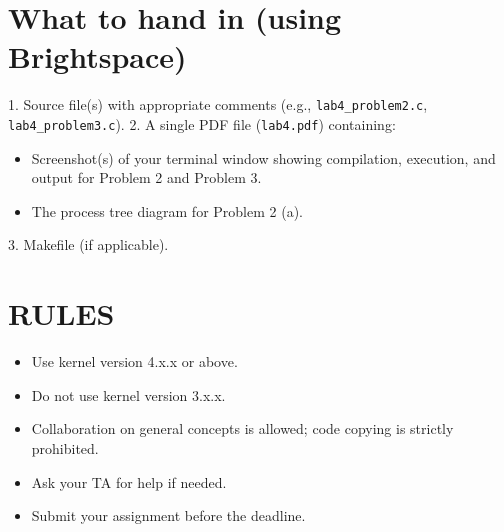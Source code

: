 \documentclass{article}
\begin{document}
\section*{What to hand in (using Brightspace)}

1. Source file(s) with appropriate comments (e.g., \texttt{lab4\_problem2.c}, \texttt{lab4\_problem3.c}).
2. A single PDF file (\texttt{lab4.pdf}) containing:
    \begin{itemize}
    \item Screenshot(s) of your terminal window showing compilation, execution, and output for Problem 2 and Problem 3.
    \item The process tree diagram for Problem 2 (a).
    \end{itemize}
3. Makefile (if applicable).


\section*{RULES}

\begin{itemize}
\item Use kernel version 4.x.x or above.
\item Do not use kernel version 3.x.x.
\item Collaboration on general concepts is allowed; code copying is strictly prohibited.
\item Ask your TA for help if needed.
\item Submit your assignment before the deadline.
\end{itemize}
\end{document}
